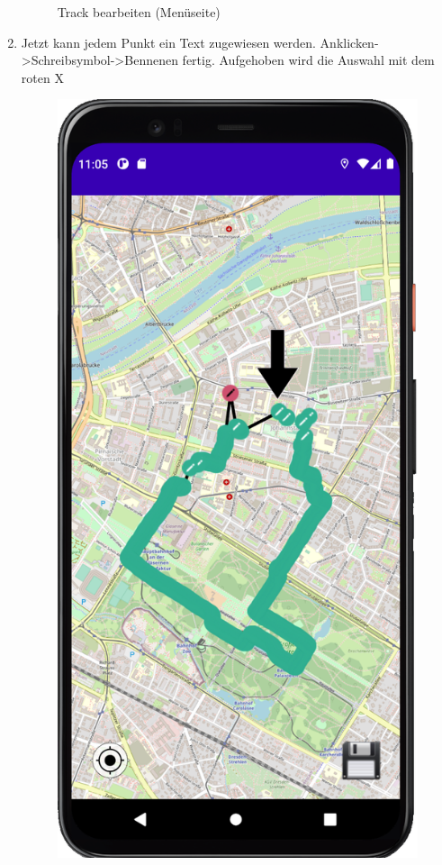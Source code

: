 \documentclass{article}
\begin{document}
\begin{enumerate}
\begin{figure}[H]
			\centering
			\caption{Track bearbeiten (Menüseite)}
	        \end{figure}
		\item Jetzt kann jedem Punkt ein Text zugewiesen werden. Anklicken->Schreibsymbol->Bennenen fertig. Aufgehoben wird die Auswahl mit dem roten X
		\begin{figure}[H]
			\captionsetup{justification=centering}
				\includegraphics[width=\linewidth]{spoi_pic3_1.png}

\end{figure}
\end{enumerate}
\end{document}
